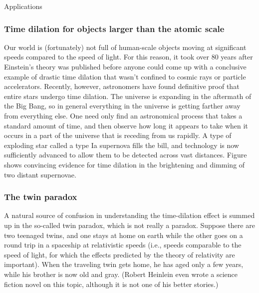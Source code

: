 \begin{envsubsection}{Applications}
\subsubsection{Time dilation for objects larger than the atomic scale}
Our world is (fortunately) not full of human-scale objects
moving at significant speeds compared to the speed of light.
For this reason, it took over 80 years after Einstein's
theory was published before anyone could come up with a
conclusive example of drastic time dilation that wasn't
confined to cosmic rays or particle accelerators. Recently,
however, astronomers have found definitive proof that entire
stars undergo time dilation. The universe is expanding in
the aftermath of the Big Bang, so in general everything in
the universe is getting farther away from everything else.
One need only find an astronomical process that takes a
standard amount of time, and then observe how long it
appears to take when it occurs in a part of the universe
that is receding from us rapidly. A type of exploding star
called a type Ia supernova fills the bill, and technology is
now sufficiently advanced to allow them to be detected
across vast distances. Figure  shows
convincing evidence for time dilation in the brightening and
dimming of two distant supernovae.


\subsubsection{The twin paradox}
A natural source of confusion in understanding the
time-dilation effect is summed up in the so-called twin
paradox, which is not really a paradox. Suppose there are
two teenaged twins, and one stays at home on earth while the
other goes on a round trip in a spaceship at relativistic
speeds (i.e., speeds comparable to the speed of light, for
which the effects predicted by the theory of relativity are
important). When the traveling twin gets home, he has aged
only a few years, while his brother is now old and gray.
(Robert Heinlein even wrote a science fiction novel on this
topic, although it is not one of his better stories.) 


\end{envsubsection}
